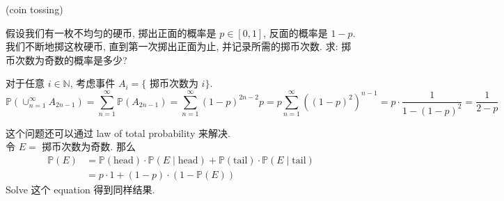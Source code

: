 \begin{example}{(coin tossing)}

假设我们有一枚不均匀的硬币, 掷出正面的概率是 $p \in[0,1]$, 反面的概率是 $1-p$. 我们不断地掷这枚硬币, 直到第一次掷出正面为止, 并记录所需的掷币次数. 求: 掷币次数为奇数的概率是多少?
\begin{solution}
对于任意 $i \in \mathbb{N}$, 考虑事件 $A_i=\{$ 掷币次数为 $i\}$.
$$
\mathbb{P}\left(\cup_{n=1}^{\infty} A_{2 n-1}\right)=\sum_{n=1}^{\infty} \mathbb{P}\left(A_{2 n-1}\right)=\sum_{n=1}^{\infty}(1-p)^{2 n-2} p=p \sum_{n=1}^{\infty}\left((1-p)^2\right)^{n-1}=p \cdot \frac{1}{1-(1-p)^2}=\frac{1}{2-p}
$$
\end{solution}
\begin{remark}
这个问题还可以通过 law of total probability 来解决.\\
令 $E=$ 掷币次数为奇数. 那么
$$
\begin{aligned}
\mathbb{P}(E) & =\mathbb{P}(\text{head}) \cdot \mathbb{P}(E \mid \text{head})+\mathbb{P}(\text{tail}) \cdot \mathbb{P}(E \mid \text{tail}) \\
& =p \cdot 1+(1-p) \cdot(1-\mathbb{P}(E))
\end{aligned}
$$
Solve 这个 equation 得到同样结果.
\end{remark}    
\end{example}